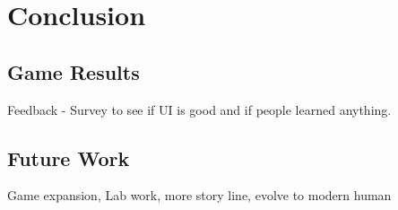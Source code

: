 \chapter{Conclusion}

\section{Game Results}
Feedback - Survey to see if UI is good and if people learned anything. 

\section{Future Work}
Game expansion, Lab work, more story line, evolve to modern human


